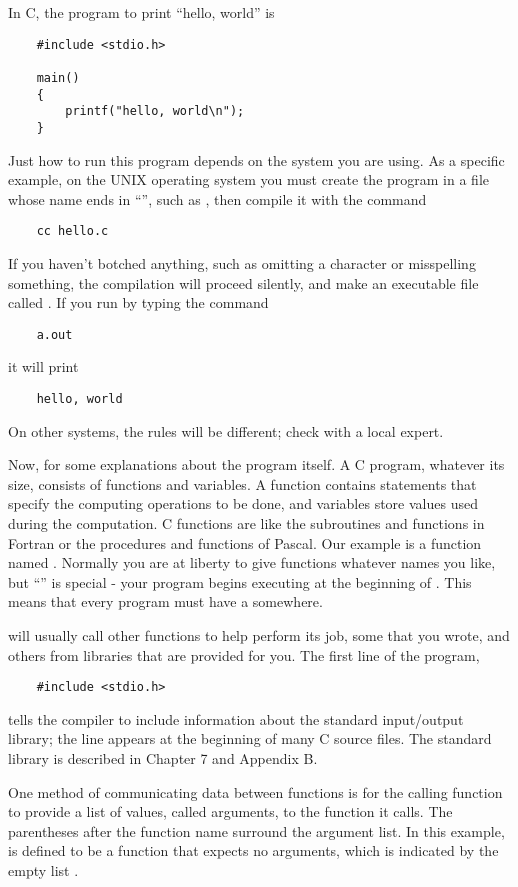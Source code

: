 In C, the program to print ``hello, world'' is
\begin{lstlisting}
	#include <stdio.h>

	main()
	{
		printf("hello, world\n");
	}
\end{lstlisting}
Just how to run this program depends on the system you are using.
As a specific example, on the UNIX operating system you must create the program in a file whose name ends in ``'', such as , then compile it with the command
\begin{lstlisting}
	cc hello.c
\end{lstlisting}
If you haven't botched anything, such as omitting a character or misspelling something, the compilation will proceed silently, and make an executable file called .
If you run  by typing the command
\begin{lstlisting}
	a.out
\end{lstlisting}
it will print
\begin{lstlisting}
	hello, world
\end{lstlisting}
On other systems, the rules will be different; check with a local expert.

Now, for some explanations about the program itself.
A C program, whatever its size, consists of functions and variables.
A function contains statements that specify the computing operations to be done, and variables store values used during the computation.
C functions are like the subroutines and functions in Fortran or the procedures and functions of Pascal.
Our example is a function named .
Normally you are at liberty to give functions whatever names you like, but ``'' is special - your program begins executing at the beginning of .
This means that every program must have a  somewhere.

 will usually call other functions to help perform its job, some that you wrote, and others from libraries that are provided for you. The first line of the program,
\begin{lstlisting}
	#include <stdio.h>
\end{lstlisting}
tells the compiler to include information about the standard input/output library; the line appears at the beginning of many C source files.
The standard library is described in Chapter 7 and Appendix B.

One method of communicating data between functions is for the calling function to provide a list of values, called arguments, to the function it calls.
The parentheses after the function name surround the argument list.
In this example,  is defined to be a function that expects no arguments, which is indicated by the empty list \code{()}.

